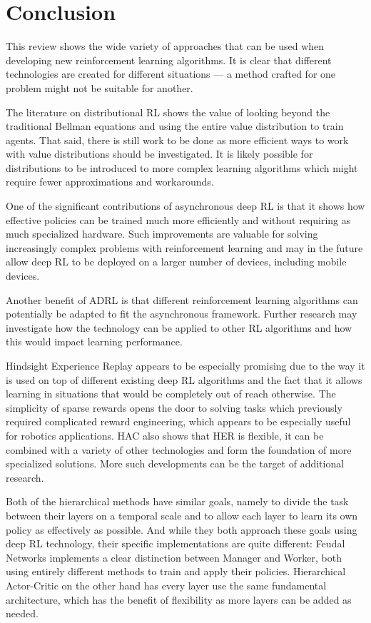 \documentclass[runningheads]{llncs}
\begin{document}
\section{Conclusion}

This review shows the wide variety of approaches that can be used when developing new reinforcement learning algorithms. It is clear that different technologies are created for different situations — a method crafted for one problem might not be suitable for another.

The literature on distributional RL shows the value of looking beyond the traditional Bellman equations and using the entire value distribution to train agents. That said, there is still work to be done as more efficient ways to work with value distributions should be investigated. It is likely possible for distributions to be introduced to more complex learning algorithms which might require fewer approximations and workarounds.

One of the significant contributions of asynchronous deep RL is that it shows how effective policies can be trained much more efficiently and without requiring as much specialized hardware. Such improvements are valuable for solving increasingly complex problems with reinforcement learning and may in the future allow deep RL to be deployed on a larger number of devices, including mobile devices.

Another benefit of ADRL is that different reinforcement learning algorithms can potentially be adapted to fit the asynchronous framework. Further research may investigate how the technology can be applied to other RL algorithms and how this would impact learning performance.

Hindsight Experience Replay appears to be especially promising due to the way it is used on top of different existing deep RL algorithms and the fact that it allows learning in situations that would be completely out of reach otherwise. The simplicity of sparse rewards opens the door to solving tasks which previously required complicated reward engineering, which appears to be especially useful for robotics applications. HAC also shows that HER is flexible, it can be combined with a variety of other technologies and form the foundation of more specialized solutions. More such developments can be the target of additional research.

Both of the hierarchical methods have similar goals, namely to divide the task between their layers on a temporal scale and to allow each layer to learn its own policy as effectively as possible. And while they both approach these goals using deep RL technology, their specific implementations are quite different: Feudal Networks implements a clear distinction between Manager and Worker, both using entirely different methods to train and apply their policies. Hierarchical Actor-Critic on the other hand has every layer use the same fundamental architecture, which has the benefit of flexibility as more layers can be added as needed.
\end{document}
